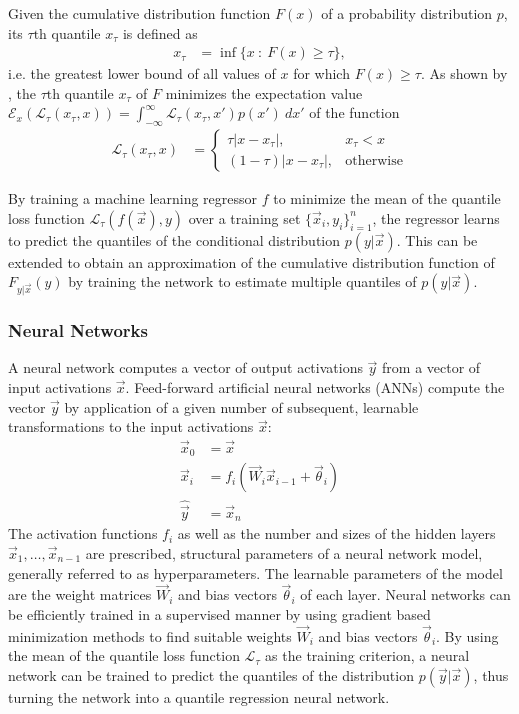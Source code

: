 \documentclass[journal abbreviation, manuscript]{copernicus}
\begin{document}
Given the cumulative distribution function $F(x)$ of a probability distribution
$p$, its $\tau\text{th}$ quantile $x_\tau$ is defined as
\begin{align}
x_\tau &= \inf \{x \: : \: F(x) \geq \tau \},
\end{align}
i.e. the greatest lower bound of all values of $x$ for which $F(x) \geq \tau$.
As shown by \citet{koenker}, the $\tau\text{th}$ quantile $x_\tau$ of $F$
minimizes the expectation value $\mathcal{E}_x\left ( \mathcal{L}_\tau(x_\tau, x) \right) = \int_{-\infty}^\infty \mathcal{L}_\tau(x_\tau, x') p(x') \: dx'$
of the function
\begin{align}\label{eq:quantile_loss}
  \mathcal{L}_{\tau}(x_\tau, x) &=
  \begin{cases}
    \tau |x - x_\tau|, & x_\tau < x \\
    (1 - \tau)|x - x_\tau|, &\text{otherwise}
    \end{cases}
\end{align}

By training a machine learning regressor $f$ to minimize the mean of the quantile loss
function $\mathcal{L}_\tau(f(\vec{x}), y)$ over a training set $\{\vec{x}_i,
y_i\}_{i = 1}^n$, the regressor learns to predict the quantiles of the
conditional distribution $p(y | \vec{x})$. This can be extended to obtain an
approximation of the cumulative distribution function of $F_{y | \vec{x}}(y)$ by
training the network to estimate multiple quantiles of $p(y | \vec{x})$.

\subsubsection{Neural Networks}

A neural network computes a vector of output activations $\vec{y}$ from a vector
of input activations $\vec{x}$. Feed-forward artificial neural networks (ANNs)
compute the vector $\vec{y}$ by application of a given number of subsequent,
learnable transformations to the input activations $\vec{x}$:
\begin{align*}
    \vec{x}_0 &= \vec{x}\\
    \vec{x}_i &= f_{i}
    \left ( \vec{W}_{i} \vec{x}_{i - 1}+ \vec{\theta}_i \right ) \\
    \hat{\vec{y}} &= \vec{x}_{n}
\end{align*}
The activation functions $f_i$ as well as the number and sizes of the hidden
layers $\vec{x}_1, \ldots, \vec{x}_{n-1}$ are prescribed, structural parameters of a
neural network model, generally referred to as hyperparameters. The learnable
parameters of the model are the weight matrices $\vec{W}_i$ and bias vectors
$\vec{\theta}_i$ of each layer. Neural networks can be efficiently trained in
a supervised manner by using gradient based minimization methods to find
suitable weights $\vec{W}_i$ and bias vectors $\vec{\theta}_i$. By using the
mean of the quantile loss function $\mathcal{L}_\tau$ as the training criterion,
a neural network can be trained to predict the quantiles of the distribution
$p(\vec{y} | \vec{x})$, thus turning the network into a quantile regression
neural network.
\end{document}
